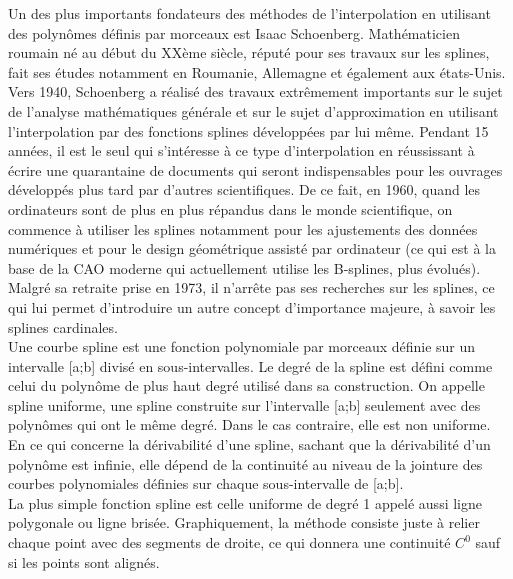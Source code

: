 \documentclass{article}
\begin{document}
Un des plus importants fondateurs des m\'{e}thodes de l'interpolation en utilisant des polyn\^{o}mes d\'{e}finis par morceaux est Isaac Schoenberg. Math\'{e}maticien roumain n\'{e} au d\'{e}but du XX\`{e}me si\`{e}cle, r\'{e}put\'{e} pour ses travaux sur les splines, fait ses \'{e}tudes notamment en Roumanie, Allemagne et \'{e}galement aux \'{e}tats-Unis. Vers 1940, Schoenberg a r\'{e}alis\'{e} des travaux extr\^{e}mement importants sur le sujet de l'analyse math\'{e}matiques g\'{e}n\'{e}rale et sur le sujet d'approximation en utilisant l'interpolation par des fonctions splines d\'{e}velopp\'{e}es par lui m\^{e}me. Pendant 15 ann\'{e}es, il est le seul qui s'int\'{e}resse \`{a} ce type d'interpolation en r\'{e}ussissant \`{a} \'{e}crire une quarantaine de documents qui seront indispensables pour les ouvrages d\'{e}velopp\'{e}s plus tard par d'autres scientifiques. De ce fait, en 1960, quand les ordinateurs sont de plus en plus r\'{e}pandus dans le monde scientifique, on commence \`{a} utiliser les splines notamment pour les ajustements des donn\'{e}es num\'{e}riques et pour le design g\'{e}om\'{e}trique assist\'{e} par ordinateur (ce qui est \`{a} la base de la CAO moderne qui actuellement utilise les B-splines, plus \'{e}volu\'{e}s). Malgr\'{e} sa retraite prise en 1973, il n'arr\^{e}te pas ses  recherches sur les splines, ce qui lui permet d'introduire un autre concept d'importance majeure, \`{a} savoir les splines cardinales.
\\
\indent
	Une courbe spline est une fonction polynomiale par morceaux d\'{e}finie sur un intervalle [a;b] divis\'{e} en sous-intervalles. Le degr\'{e} de la spline est d\'{e}fini comme celui du polyn\^{o}me de plus haut degr\'{e} utilis\'{e} dans sa construction. On appelle spline uniforme, une spline construite sur l'intervalle [a;b] seulement avec des polyn\^{o}mes qui ont le m\^{e}me degr\'{e}. Dans le cas contraire, elle est non uniforme.
	\\
\indent
En ce qui concerne la d\'{e}rivabilit\'{e} d'une spline, sachant que la d\'{e}rivabilit\'{e} d'un polyn\^{o}me est infinie, elle d\'{e}pend de la continuit\'{e} au niveau de la jointure des courbes polynomiales d\'{e}finies sur chaque sous-intervalle de [a;b].
\\
\indent
La plus simple fonction spline est celle uniforme de degr\'{e} 1 appel\'{e} aussi ligne polygonale ou ligne bris\'{e}e. Graphiquement, la m\'{e}thode consiste juste \`{a} relier chaque point avec des segments de droite, ce qui donnera une continuit\'{e} $C^0$ sauf si les points sont align\'{e}s.
\end{document}
